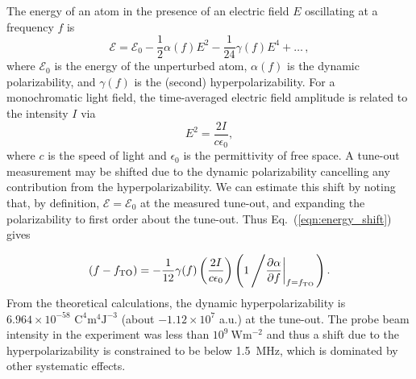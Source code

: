 	The energy of an atom in the presence of an electric field \(E\) oscillating at a frequency \(f\) is 
	\begin{equation}
	\mathcal{E}=\mathcal{E}_0 - \frac{1}{2} \alpha(f) E^2 - \frac{1}{24} \gamma(f) E^4 + \ldots \, , \label{eqn:energy_shift}
	\end{equation}
	where \(\mathcal{E}_0\) is the energy of the unperturbed atom, \(\alpha(f)\) is the dynamic polarizability, and \(\gamma(f)\) is the (second) hyperpolarizability.  
	For a monochromatic light field, the time-averaged electric field amplitude is related to the intensity $I$ via
	\begin{equation}
	    E^2=\frac{2 I}{c \epsilon_0},
	\end{equation}
	where \(c\) is the speed of light and \(\epsilon_0\) is the permittivity of free space. 
	A tune-out measurement may be shifted due to the dynamic polarizability cancelling any contribution from the hyperpolarizability. 
	We can estimate this shift by noting that, by definition, \(\mathcal{E}=\mathcal{E}_0\) at the measured tune-out, and expanding the polarizability to first order about the tune-out.
	Thus Eq.~(\ref{eqn:energy_shift}) gives 
	
	\begin{equation}
	 (f-f_\mathrm{TO} ) = - \frac{1}{12} \gamma(f) \left(\frac{2 I}{c \epsilon_0}\right) \left(1\left/ \frac{\partial\alpha}{\partial f}\bigg|_{f=f_\mathrm{TO}} \right. \right).
	\end{equation}
	From the theoretical calculations, the dynamic hyperpolarizability  is $6.964\times10^{-58}$ $\mathrm{C}^4\mathrm{m}^4\mathrm{J}^{-3}$ (about $-1.12\times10^{7}$ a.u.) at the tune-out. The probe beam intensity in the experiment was less than $10^{9}\: \mathrm{W} \mathrm{m}^{-2}$ and thus a shift due to the hyperpolarizability is  constrained to be below 1.5~MHz, which is dominated by other systematic effects.


